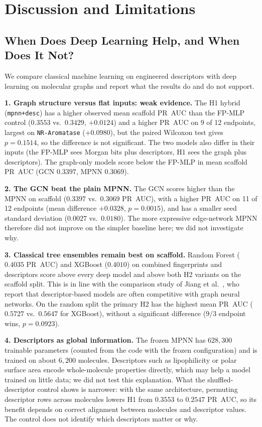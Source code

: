 \section{Discussion and Limitations}
\label{sec:discussion}

\subsection{When Does Deep Learning Help, and When Does It Not?}
We compare classical machine learning on engineered descriptors with deep learning on molecular graphs and report what the results do and do not support.

\textbf{1. Graph structure versus flat inputs: weak evidence.} The H1 hybrid (\texttt{mpnn+desc}) has a higher observed mean scaffold PR~AUC than the FP-MLP control ($0.3553$ vs.\ $0.3429$, $+0.0124$) and a higher PR~AUC on 9 of 12 endpoints, largest on \texttt{NR-Aromatase} ($+0.0980$), but the paired Wilcoxon test gives $p = 0.1514$, so the difference is not significant. The two models also differ in their inputs (the FP-MLP sees Morgan bits plus descriptors, H1 sees the graph plus descriptors). The graph-only models score below the FP-MLP in mean scaffold PR~AUC (GCN $0.3397$, MPNN $0.3069$).

\textbf{2. The GCN beat the plain MPNN.} The GCN scores higher than the MPNN on scaffold ($0.3397$ vs.\ $0.3069$ PR~AUC), with a higher PR~AUC on 11 of 12 endpoints (mean difference $+0.0328$, $p = 0.0015$), and has a smaller seed standard deviation ($0.0027$ vs.\ $0.0180$). The more expressive edge-network MPNN therefore did not improve on the simpler baseline here; we did not investigate why.

\textbf{3. Classical tree ensembles remain best on scaffold.} Random Forest ($0.4035$ PR~AUC) and XGBoost ($0.4010$) on combined fingerprints and descriptors score above every deep model and above both H2 variants on the scaffold split. This is in line with the comparison study of Jiang et al.~\cite{jiang2021could}, who report that descriptor-based models are often competitive with graph neural networks. On the random split the primary H2 has the highest mean PR~AUC ($0.5727$ vs.\ $0.5647$ for XGBoost), without a significant difference ($9/3$ endpoint wins, $p = 0.0923$).

\textbf{4. Descriptors as global information.} The frozen MPNN has $628{,}300$ trainable parameters (counted from the code with the frozen configuration) and is trained on about $6{,}200$ molecules. Descriptors such as lipophilicity or polar surface area encode whole-molecule properties directly, which may help a model trained on little data; we did not test this explanation. What the shuffled-descriptor control shows is narrower: with the same architecture, permuting descriptor rows across molecules lowers H1 from $0.3553$ to $0.2547$ PR~AUC, so its benefit depends on correct alignment between molecules and descriptor values. The control does not identify which descriptors matter or why.

